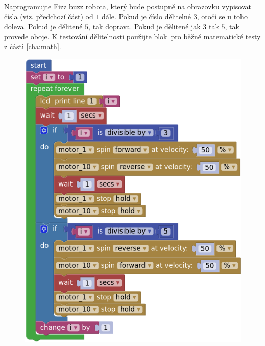 \documentclass[../main.tex]{subfiles}
\begin{document}
	\begin{question*}
		Naprogramujte \href{https://en.wikipedia.org/wiki/Fizz\_buzz}{Fizz buzz} robota, který bude postupně na obrazovku vypisovat čísla (viz. předchozí část) od $1$ dále. Pokud je číslo dělitelné $3$, otočí se u toho doleva. Pokud je dělitené $5$, tak doprava. Pokud je dělitené jak $3$ tak $5$, tak provede oboje. K testování dělitelnosti použijte blok~pro běžné matematické testy z části \ref{cha:math}.
	\end{question*}

	\begin{solution}
		\begin{figure}
			\centering
			\begin{minipage}{0.4\textwidth}
				\includegraphics[width=\linewidth]{Images/05/solfb.png}
			\end{minipage}
		\end{figure}
	\end{solution}
\end{document}

